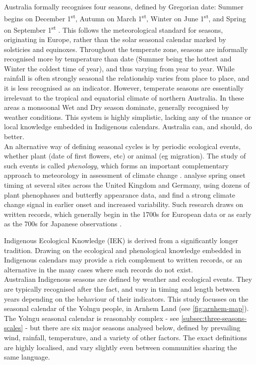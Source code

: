 Australia formally recognises four seasons, defined by Gregorian date:
Summer begins on December 1\textsuperscript{st}, Autumn on March
1\textsuperscript{st}, Winter on June 1\textsuperscript{st}, and Spring
on September 1\textsuperscript{st} \citep{wells2013}. This follows the
meteorological standard for seasons, originating in Europe, rather
than the solar seasonal calendar marked by solsticies and equinoxes.
%
Throughout the temperate zone, seasons are informally recognised more by
temperature than date (Summer being the hottest and Winter the coldest time
of year), and thus varying from year to year.  While rainfall is often
strongly  seasonal the relationship varies from place to place, and it is
less recognised as an indicator.
%
However, temperate seasons are essentially irrelevant to the tropical and
equatorial climate of northern Australia.  In these areas a monsoonal Wet
and Dry season dominate, generally recognised by weather conditions.
This system is highly simplistic, lacking any of the nuance or local
knowledge embedded in Indigenous calendars.  Australia can, and should,
do better.\\


An alternative way of defining seasonal cycles is by periodic ecological
events, whether plant (date of first flowers, etc) or animal (eg migration).
The study of such events is called \textit{phenology}, which forms an
important complementary approach to meteorology in assessment of climate
change \citep[eg.][]{roy2000}.  \citet{menzel2006} analyse spring onset timing
at several sites across the United Kingdom and Germany, using dozens of
plant phenophases and butterfly appearance data, and find a strong climate
change signal in earlier onset and increased variability.  Such research
draws on written records, which generally begin in the 1700s for European
data or as early as the 700s for Japanese observations \citep{sparks2002}.

Indigenous Ecological Knowledge (IEK) is derived from a significantly longer
tradition.  Drawing on the ecological and phenological knowledge embedded
in Indigenous calendars may provide a rich complement to written records,
or an alternative in the many cases where such records do not exist.\\


Australian Indigenous seasons are defined by weather and ecological events.
They are typically recognised after the fact, and vary in timing and length
between years depending on the behaviour of their indicators.  This study
focusses on the seasonal calendar of the Yolngu people, in Arnhem Land (see
\cref{fig:arnhem-map}).
%
The Yolngu seasonal calendar is reasonably complex - see
\cref{subsec:three-seasons-scales} - but there are six major seasons
analysed below, defined by prevailing wind, rainfall, temperature, and a
variety of other factors.  The exact definitions are highly localised,
and vary slightly even between communities sharing the same language.



